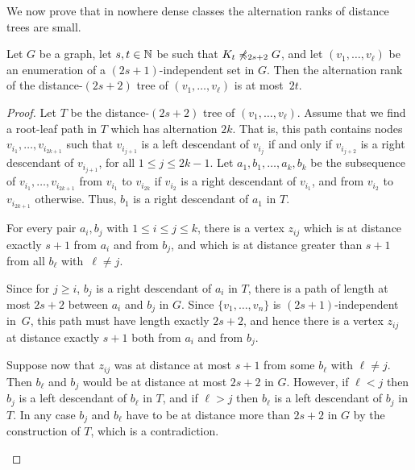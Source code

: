 We now prove that in nowhere dense classes the alternation ranks of 
distance trees are small. 

\begin{lemma}\label{thm:alternation-rank-type-tree}
Let $G$ be a graph, let $s,t\in \mathbb{N}$ be such that $K_t\not\preccurlyeq_{2s+2} G$, and let
$(v_1,\ldots, v_\ell)$ be an enumeration of a $(2s+1)$-independent set 
in $G$. Then the alternation rank of the distance-$(2s+2)$ tree of 
$(v_1,\ldots,v_\ell)$ is at most~$2t$. 
\end{lemma}
\begin{proof}
Let $T$ be the distance-$(2s+2)$ tree of $(v_1,\ldots,v_\ell)$.
Assume that we find a root-leaf path in $T$ which has alternation $2k$.
That is, this path contains nodes $v_{i_1},\ldots, v_{i_{2k+1}}$ such that $v_{i_{j+1}}$ is a left descendant of $v_{i_j}$
if and only if $v_{i_{j+2}}$ is a right descendant of $v_{i_{j+1}}$, for all $1\leq j\leq 2k-1$.
Let $a_1,b_1,\ldots, a_k,b_k$ be the subsequence of $v_{i_1},\ldots, v_{i_{2k+1}}$ from $v_{i_1}$ to $v_{i_{2k}}$ if $v_{i_2}$ is a right descendant of $v_{i_1}$,
and from $v_{i_2}$ to $v_{i_{2k+1}}$ otherwise. Thus, $b_1$ is a right descendant of $a_1$ in $T$.

\begin{claim}\label{cl:zij}
For every pair $a_i,b_j$ with $1\leq i\leq j\leq k$, there
is a vertex $z_{ij}$ which is at distance exactly $s+1$ from 
$a_i$ and from $b_j$, and which is at distance greater than $s+1$ 
from all $b_\ell$ with~$\ell\neq j$. 
\end{claim}
\begin{clproof}
Since for $j\geq i$, $b_j$ is a right descendant of $a_i$ in $T$, 
there is a path of length at most $2s+2$ between $a_i$ and $b_j$ in $G$. 
Since $\{v_1,\ldots, v_n\}$ is $(2s+1)$-independent in~$G$, this path
must have length exactly $2s+2$, and hence there is a vertex $z_{ij}$ 
at distance exactly $s+1$ both from $a_i$ and from $b_j$. 

Suppose now that $z_{ij}$ was at distance at most $s+1$ from some $b_\ell$ with $\ell\neq j$.
Then $b_\ell$ and $b_j$ would be at distance at most $2s+2$ in $G$.
However, if $\ell<j$ then $b_j$ is a left descendant of $b_\ell$ in $T$, and if $\ell>j$ then $b_\ell$ is a left descendant of $b_j$ in $T$.
In any case $b_j$ and $b_\ell$ have to be at distance more than $2s+2$ in $G$ by the construction of $T$, which is a contradiction.
\end{clproof}


\end{proof}
